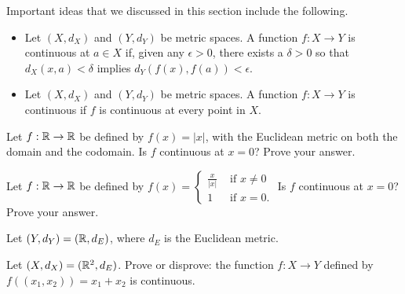 \label{sec_cont_func_summ}
Important ideas that we discussed in this section include the following.
\begin{itemize}
\item Let $(X,d_X)$ and $(Y, d_Y)$ be metric spaces. A function $f:X \to Y$ is continuous at $a \in X$ if, given any $\epsilon > 0$, there exists a $\delta > 0$ so that $d_X(x,a)< \delta$ implies $d_Y(f(x), f(a)) < \epsilon$.  

\item Let $(X,d_X)$ and $(Y, d_Y)$ be metric spaces. A function $f:X \to Y$ is continuous if $f$ is continuous at every point in $X$.
\end{itemize}

\label{sec_cont_func_exer}

\be

\item Let $f: \mathbb{R} \to \mathbb{R}$ be defined by $f(x) = |x|$, with the Euclidean metric on both the domain and the codomain. Is $f$ continuous at $x=0$? Prove your answer.

\begin{comment}

\ExerciseSolution The answer is yes. Let $\epsilon$ be greater than $0$. Let $\delta = \epsilon$. Then $|x - 0| < \delta$ means that $|x| < \delta$. Then $|f(x)-f(0)| = |x| < \delta = \epsilon$. So $f$ is continuous at $0$. 

\end{comment}

\item Let $f: \mathbb{R} \to \mathbb{R}$ be defined by $f(x) = \begin{cases} \frac{x}{|x|} &\text{ if } x \neq 0 \\ 1 &\text{ if } x=0. \end{cases}$ Is $f$ continuous at $x=0$? Prove your answer.

\begin{comment}

\ExerciseSolution The answer is no. Let $\epsilon$ be greater than $0$ and less than $1$, and let $\delta$ be greater than $0$. If $x \in (0, \delta)$, then $f(x) = 1$. Then $|x - 0| < \delta$ implies that 
\[|f(x)-f(0)| = |1-0|  = 1 > \epsilon.\]   


\end{comment}


\item Let $(Y, d_Y) = (\mathbb{R}, d_E)$, where $d_E$ is the Euclidean metric. %
\ba
\item Let $(X,d_X) = (\mathbb{R}^2, d_E)$.  Prove or disprove: the function $f:X \to Y$ defined by $f((x_1,x_2)) = x_1 + x_2$ is continuous. 

